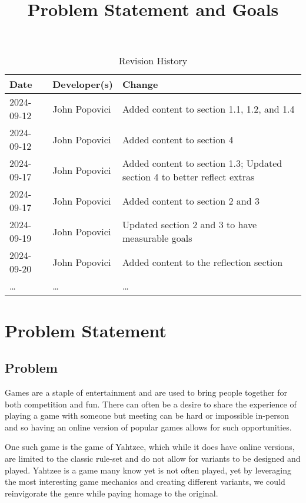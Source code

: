 \documentclass{article}
\title{Problem Statement and Goals\\\progname}
\author{\authname}
\date{}
\begin{document}
\maketitle

\begin{table}[hp]
\caption{Revision History} \label{TblRevisionHistory}
\begin{tabularx}{\textwidth}{llX}
\toprule
\textbf{Date} & \textbf{Developer(s)} & \textbf{Change}\\
\midrule
2024-09-12 & John Popovici & Added content to section 1.1, 1.2, and 1.4\\
2024-09-12 & John Popovici & Added content to section 4\\
2024-09-17 & John Popovici & Added content to section 1.3; Updated section 4 to better reflect extras\\
2024-09-17 & John Popovici & Added content to section 2 and 3\\
2024-09-19 & John Popovici & Updated section 2 and 3 to have measurable goals\\
2024-09-20 & John Popovici & Added content to the reflection section\\
\dots & \dots & \dots\\
\bottomrule
\end{tabularx}
\end{table}

\newpage
\section{Problem Statement}


\subsection{Problem}

Games are a staple of entertainment and are used to bring people together for both competition and fun.
There can often be a desire to share the experience of playing a game with someone but meeting can be hard or impossible in-person and so having an online version of popular games allows for such opportunities.

One such game is the game of Yahtzee, which while it does have online versions, are limited to the classic rule-set and do not allow for variants to be designed and played.
Yahtzee is a game many know yet is not often played, yet by leveraging the most interesting game mechanics and creating different variants, we could reinvigorate the genre while paying homage to the original.
\end{document}
